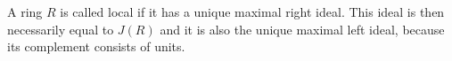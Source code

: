 A ring $R$ is called local if it has a unique maximal right ideal. This ideal
is then necessarily equal to $J(R)$ and it is also the unique maximal left ideal,
because its complement consists of units.
